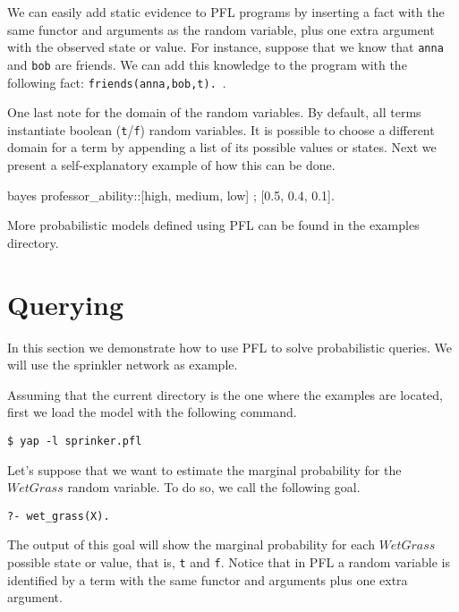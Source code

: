\documentclass{article}
\begin{document}
We can easily add static evidence to PFL programs by inserting a fact with the same functor and arguments as the random variable, plus one extra argument with the observed state or value. For instance, suppose that we know that \texttt{anna} and \texttt{bob} are friends. We can add this knowledge to the program with the following fact: \texttt{friends(anna,bob,t).}~.

One last note for the domain of the random variables. By default, all terms instantiate boolean (\texttt{t}/\texttt{f}) random variables. It is possible to choose a different domain for a term by appending a list of its possible values or states. Next we present a self-explanatory example of how this can be done.

\begin{pflcode}
bayes professor_ability::[high, medium, low] ; [0.5, 0.4, 0.1].
\end{pflcode}

More probabilistic models defined using PFL can be found in the examples directory.



\section{Querying}
In this section we demonstrate how to use PFL to solve probabilistic queries. We will use the sprinkler network as example.

Assuming that the current directory is the one where the examples are located, first we load the model with the following command.

\texttt{\$ yap -l sprinker.pfl}

Let's suppose that we want to estimate the marginal probability for the $WetGrass$ random variable. To do so, we call the following goal.

\texttt{?- wet\_grass(X).}

The output of this goal will show the marginal probability for each $WetGrass$ possible state or value, that is, \texttt{t} and \texttt{f}. Notice that in PFL a random variable is identified by a term with the same functor and arguments plus one extra argument.
\end{document}
